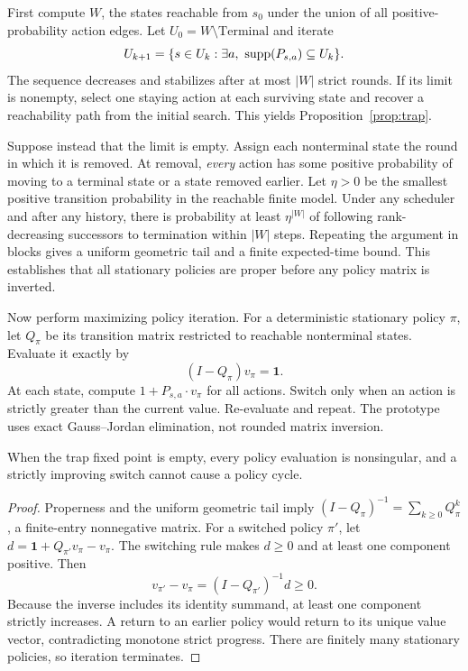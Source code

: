 First compute $W$, the states reachable from $s_0$ under the union of all
positive-probability action edges. Let $U_0=W\setminus\mathrm{Terminal}$ and
iterate
\begin{equation}
 U_{k+1}=\{s\in U_k:\exists a,\ \supp(P_{s,a})\subseteq U_k\}.
 \label{eq:trap-fp}
\end{equation}
The sequence decreases and stabilizes after at most $|W|$ strict rounds.
If its limit is nonempty, select one staying action at each surviving state
and recover a reachability path from the initial search. This yields
Proposition~\ref{prop:trap}.

Suppose instead that the limit is empty. Assign each nonterminal state the
round in which it is removed. At removal, \emph{every} action has some positive
probability of moving to a terminal state or a state removed earlier. Let
$\eta>0$ be the smallest positive transition probability in the reachable
finite model. Under any scheduler and after any history, there is probability
at least $\eta^{|W|}$ of following rank-decreasing successors to termination
within $|W|$ steps. Repeating the argument in blocks gives a uniform geometric
tail and a finite expected-time bound. This establishes that all stationary
policies are proper before any policy matrix is inverted.

Now perform maximizing policy iteration. For a deterministic stationary policy
$\pi$, let $Q_\pi$ be its transition matrix restricted to reachable nonterminal
states. Evaluate it exactly by
\begin{equation}
 (I-Q_\pi)v_\pi=\boldsymbol 1.
 \label{eq:policy-eval}
\end{equation}
At each state, compute $1+P_{s,a}\cdot v_\pi$ for all actions. Switch only when
an action is strictly greater than the current value. Re-evaluate and repeat.
The prototype uses exact Gauss--Jordan elimination, not rounded matrix
inversion.

\begin{lemma}
\label{lem:policy-improve}
When the trap fixed point is empty, every policy evaluation is nonsingular,
and a strictly improving switch cannot cause a policy cycle.
\end{lemma}
\begin{proof}
Properness and the uniform geometric tail imply
$(I-Q_\pi)^{-1}=\sum_{k\ge0}Q_\pi^k$, a finite-entry nonnegative matrix.
For a switched policy $\pi'$, let
$d=\boldsymbol1+Q_{\pi'}v_\pi-v_\pi$. The switching rule makes $d\ge0$ and
at least one component positive. Then
\[
 v_{\pi'}-v_\pi=(I-Q_{\pi'})^{-1}d\ge0.
\]
Because the inverse includes its identity summand, at least one component
strictly increases. A return to an earlier policy would return to its unique
value vector, contradicting monotone strict progress. There are finitely many
stationary policies, so iteration terminates.
\end{proof}

